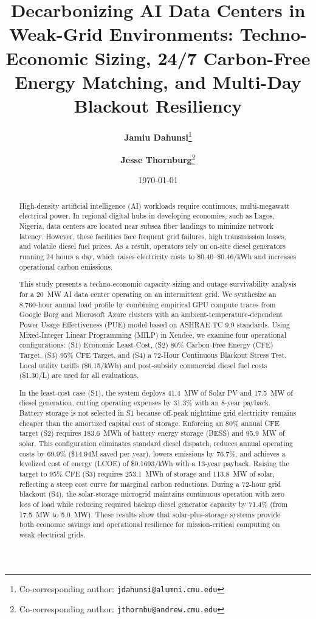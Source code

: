 \documentclass[11pt,a4paper]{article}
\title{\textbf{\Large Decarbonizing AI Data Centers in Weak-Grid Environments: Techno-Economic Sizing, 24/7 Carbon-Free Energy Matching, and Multi-Day Blackout Resiliency}}
\author{\textbf{Jamiu Dahunsi}\thanks{Co-corresponding author: \texttt{jdahunsi@alumni.cmu.edu}}}
\author{\textbf{Jesse Thornburg}\thanks{Co-corresponding author: \texttt{jthornbu@andrew.cmu.edu}}}
\affil{Department of Electrical and Computer Engineering, Carnegie Mellon University, Pittsburgh, PA 15213, USA}
\date{\today}
\begin{document}
\maketitle

\begin{abstract}
\noindent High-density artificial intelligence (AI) workloads require continuous, multi-megawatt electrical power. In regional digital hubs in developing economies, such as Lagos, Nigeria, data centers are located near subsea fiber landings to minimize network latency. However, these facilities face frequent grid failures, high transmission losses, and volatile diesel fuel prices. As a result, operators rely on on-site diesel generators running 24 hours a day, which raises electricity costs to \$0.40--\$0.46/kWh and increases operational carbon emissions.

\vspace{0.5em}
\noindent This study presents a techno-economic capacity sizing and outage survivability analysis for a 20~MW AI data center operating on an intermittent grid. We synthesize an 8,760-hour annual load profile by combining empirical GPU compute traces from Google Borg and Microsoft Azure clusters with an ambient-temperature-dependent Power Usage Effectiveness (PUE) model based on ASHRAE TC 9.9 standards. Using Mixed-Integer Linear Programming (MILP) in Xendee, we examine four operational configurations: (S1) Economic Least-Cost, (S2) 80\% Carbon-Free Energy (CFE) Target, (S3) 95\% CFE Target, and (S4) a 72-Hour Continuous Blackout Stress Test. Local utility tariffs (\$0.15/kWh) and post-subsidy commercial diesel fuel costs (\$1.30/L) are used for all evaluations.

\vspace{0.5em}
\noindent In the least-cost case (S1), the system deploys 41.4~MW of Solar PV and 17.5~MW of diesel generation, cutting operating expenses by 31.3\% with an 8-year payback. Battery storage is not selected in S1 because off-peak nighttime grid electricity remains cheaper than the amortized capital cost of storage. Enforcing an 80\% annual CFE target (S2) requires 183.6~MWh of battery energy storage (BESS) and 95.9~MW of solar. This configuration eliminates standard diesel dispatch, reduces annual operating costs by 69.9\% (\$14.94M saved per year), lowers emissions by 76.7\%, and achieves a levelized cost of energy (LCOE) of \$0.1693/kWh with a 13-year payback. Raising the target to 95\% CFE (S3) requires 253.1~MWh of storage and 113.8~MW of solar, reflecting a steep cost curve for marginal carbon reductions. During a 72-hour grid blackout (S4), the solar-storage microgrid maintains continuous operation with zero loss of load while reducing required backup diesel generator capacity by 71.4\% (from 17.5~MW to 5.0~MW). These results show that solar-plus-storage systems provide both economic savings and operational resilience for mission-critical computing on weak electrical grids.
\end{abstract}
\end{document}
